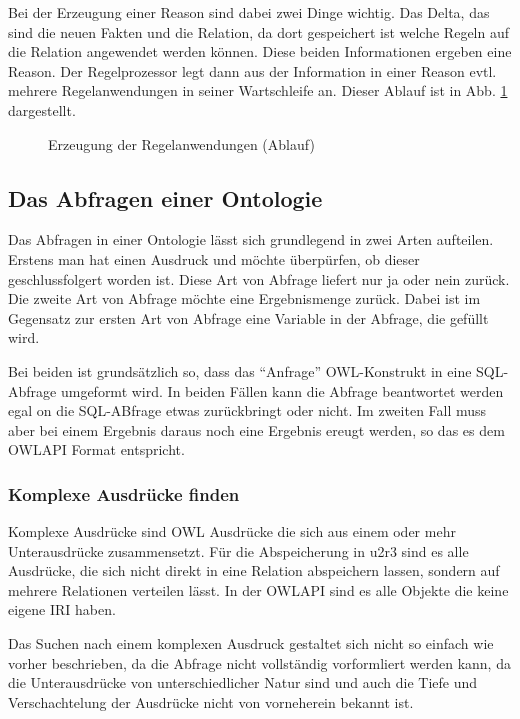 Bei der Erzeugung einer Reason sind dabei zwei Dinge wichtig. Das Delta, das sind die neuen Fakten und die Relation, da dort gespeichert ist welche Regeln auf die Relation angewendet werden können. Diese beiden Informationen ergeben eine Reason. Der Regelprozessor legt dann aus der Information in einer Reason evtl. mehrere Regelanwendungen in seiner Wartschleife an. Dieser Ablauf ist in Abb. \ref{diagram-ruleexecution2} dargestellt.

\begin{figure}[htp]
\begin{center}
  \caption{Erzeugung der Regelanwendungen (Ablauf)}
  \label{diagram-ruleexecution2}
\end{center}
\end{figure}

\subsection{Das Abfragen einer Ontologie}
Das Abfragen in einer Ontologie lässt sich grundlegend in zwei Arten aufteilen. Erstens man hat einen Ausdruck und möchte überpürfen, ob dieser geschlussfolgert worden ist. Diese Art von Abfrage liefert nur ja oder nein zurück. Die zweite Art von Abfrage möchte eine Ergebnismenge zurück. Dabei ist im Gegensatz zur ersten Art von Abfrage eine Variable in der Abfrage, die gefüllt wird.

Bei beiden ist grundsätzlich so, dass das ``Anfrage'' OWL-Konstrukt in eine SQL-Abfrage umgeformt wird. In beiden Fällen kann die Abfrage beantwortet werden egal on die SQL-ABfrage etwas zurückbringt oder nicht. Im zweiten Fall muss aber bei einem Ergebnis daraus noch eine Ergebnis ereugt werden, so das es dem OWLAPI Format entspricht.

\subsubsection{Komplexe Ausdrücke finden}

Komplexe Ausdrücke sind OWL Ausdrücke die sich aus einem oder mehr Unterausdrücke zusammensetzt. Für die Abspeicherung in u2r3 sind es alle Ausdrücke, die sich nicht direkt in eine Relation abspeichern lassen, sondern auf mehrere Relationen verteilen lässt. In der OWLAPI sind es alle Objekte die keine eigene IRI haben.

Das Suchen nach einem komplexen Ausdruck gestaltet sich nicht so einfach wie vorher beschrieben, da die Abfrage nicht vollständig vorformliert werden kann, da die Unterausdrücke von unterschiedlicher Natur sind und auch die Tiefe und Verschachtelung der Ausdrücke nicht von vorneherein bekannt ist.

